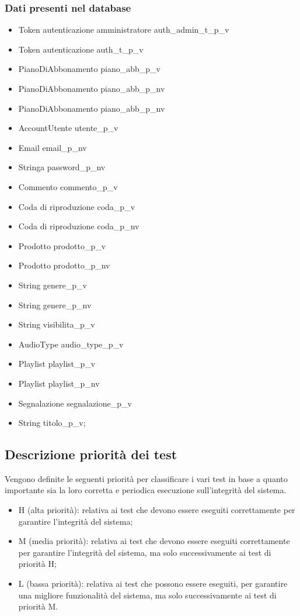 \subsubsection{Dati presenti nel database}
\begin{itemize}
    \item Token autenticazione amministratore auth\_admin\_t\_p\_v
    \item Token autenticazione auth\_t\_p\_v
    \item PianoDiAbbonamento piano\_abb\_p\_v
    \item PianoDiAbbonamento piano\_abb\_p\_nv
    \item PianoDiAbbonamento piano\_abb\_p\_nv
    \item AccountUtente utente\_p\_v
    \item Email email\_p\_nv
    \item Stringa password\_p\_nv
    \item Commento commento\_p\_v
    \item Coda di riproduzione coda\_p\_v
    \item Coda di riproduzione coda\_p\_nv
    \item Prodotto prodotto\_p\_v
    \item Prodotto prodotto\_p\_nv
    \item String genere\_p\_v
    \item String genere\_p\_nv
    \item String visibilita\_p\_v
    \item AudioType audio\_type\_p\_v
    \item Playlist playlist\_p\_v
    \item Playlist playlist\_p\_nv
    \item Segnalazione segnalazione\_p\_v
    \item String titolo\_p\_v;

\end{itemize}

\subsection{Descrizione priorità dei test}

Vengono definite le seguenti priorità per classificare i vari test in base a quanto importante sia la
loro corretta e periodica esecuzione sull'integrità del sistema.
\begin{itemize}
    \item H (alta priorità): relativa ai test che devono essere eseguiti correttamente per garantire l'integrità
          del sistema;
    \item M (media priorità): relativa ai test che devono essere eseguiti correttamente per garantire l'integrità
          del sistema, ma solo successivamente ai test di priorità H;
    \item L (bassa priorità): relativa ai test che possono essere eseguiti, per garantire una migliore funzionalità
          del sistema, ma solo successivamente ai test di priorità M.
\end{itemize}


